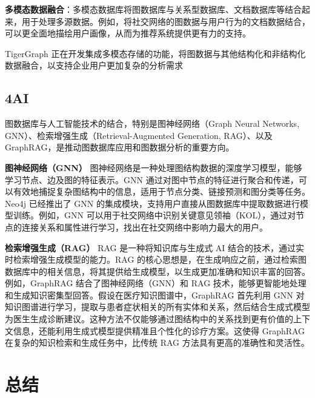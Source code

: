 \documentclass[12pt,hyperref,a4paper,UTF8]{ctexart}
\begin{document}
\textbf{多模态数据融合}：多模态数据库将图数据库与关系型数据库、文档数据库等结合起来，用于处理多源数据。例如，将社交网络的图数据与用户行为的文档数据结合，可以更全面地描绘用户画像，从而为推荐系统提供更有力的支持\cite{han2021multimodal}。

TigerGraph 正在开发集成多模态存储的功能，将图数据与其他结构化和非结构化数据融合，以支持企业用户更加复杂的分析需求

\subsection{4AI}
图数据库与人工智能技术的结合，特别是图神经网络（Graph Neural Networks, GNN）、检索增强生成（Retrieval-Augmented Generation, RAG）、以及 GraphRAG，是推动图数据库应用和图数据分析的重要方向。

\textbf{图神经网络（GNN）}
图神经网络是一种处理图结构数据的深度学习模型，能够学习节点、边及图的特征表示。GNN 通过对图中节点的特征进行聚合和传递，可以有效地捕捉复杂图结构中的信息，适用于节点分类、链接预测和图分类等任务\cite{wu2020gnn}。Neo4j 已经推出了 GNN 的集成模块，支持用户直接从图数据库中提取数据进行模型训练。例如，GNN 可以用于社交网络中识别关键意见领袖（KOL），通过对节点的连接关系和属性进行学习，找出在社交网络中影响力最大的用户。


\textbf{检索增强生成（RAG）}
RAG 是一种将知识库与生成式 AI 结合的技术，通过实时检索增强生成模型的能力。RAG 的核心思想是，在生成响应之前，通过检索图数据库中的相关信息，将其提供给生成模型，以生成更加准确和知识丰富的回答。例如，GraphRAG 结合了图神经网络（GNN）和 RAG 技术，能够更智能地处理和生成知识密集型回答。假设在医疗知识图谱中，GraphRAG 首先利用 GNN 对知识图谱进行学习，提取与患者症状相关的所有实体和关系，然后结合生成式模型为医生生成诊断建议。这种方法不仅能够通过图结构中的关系找到更有价值的上下文信息，还能利用生成式模型提供精准且个性化的诊疗方案。这使得 GraphRAG 在复杂的知识检索和生成任务中，比传统 RAG 方法具有更高的准确性和灵活性\cite{jiang2024reasoningenhancedhealthcarepredictionsknowledge}。




\section{总结}
\end{document}
